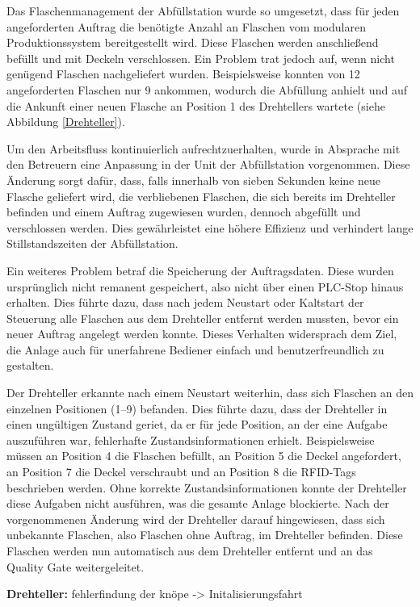Das Flaschenmanagement der Abfüllstation wurde so umgesetzt, dass für jeden angeforderten Auftrag die benötigte Anzahl an Flaschen vom modularen 
Produktionssystem bereitgestellt wird. Diese Flaschen werden anschließend befüllt und mit Deckeln verschlossen. Ein Problem trat jedoch auf, wenn 
nicht genügend Flaschen nachgeliefert wurden. Beispielsweise konnten von 12 angeforderten Flaschen nur 9 ankommen, wodurch die Abfüllung anhielt 
und auf die Ankunft einer neuen Flasche an Position 1 des Drehtellers wartete (siehe Abbildung \ref{Drehteller}).

Um den Arbeitsfluss kontinuierlich aufrechtzuerhalten, wurde in Absprache mit den Betreuern eine Anpassung in der Unit der Abfüllstation 
vorgenommen. Diese Änderung sorgt dafür, dass, falls innerhalb von sieben Sekunden keine neue Flasche geliefert wird, die verbliebenen Flaschen, 
die sich bereits im Drehteller befinden und einem Auftrag zugewiesen wurden, dennoch abgefüllt und verschlossen werden. Dies gewährleistet eine 
höhere Effizienz und verhindert lange Stillstandszeiten der Abfüllstation.

Ein weiteres Problem betraf die Speicherung der Auftragsdaten. Diese wurden ursprünglich nicht remanent gespeichert, also nicht über einen 
PLC-Stop hinaus erhalten. Dies führte dazu, dass nach jedem Neustart oder Kaltstart der Steuerung alle Flaschen aus dem Drehteller entfernt 
werden mussten, bevor ein neuer Auftrag angelegt werden konnte. Dieses Verhalten widersprach dem Ziel, die Anlage auch für unerfahrene Bediener 
einfach und benutzerfreundlich zu gestalten.

Der Drehteller erkannte nach einem Neustart weiterhin, dass sich Flaschen an den einzelnen Positionen (1–9) befanden. Dies führte dazu, dass der 
Drehteller in einen ungültigen Zustand geriet, da er für jede Position, an der eine Aufgabe auszuführen war, fehlerhafte Zustandsinformationen 
erhielt. Beispielsweise müssen an Position 4 die Flaschen befüllt, an Position 5 die Deckel angefordert, an Position 7 die Deckel verschraubt 
und an Position 8 die RFID-Tags beschrieben werden. Ohne korrekte Zustandsinformationen konnte der Drehteller diese Aufgaben nicht ausführen, 
was die gesamte Anlage blockierte. Nach der vorgenommenen Änderung wird der Drehteller darauf hingewiesen, dass sich unbekannte Flaschen, also 
Flaschen ohne Auftrag, im Drehteller befinden. Diese Flaschen werden nun automatisch aus dem Drehteller entfernt und an das Quality Gate 
weitergeleitet.

\textbf{Drehteller:} 
fehlerfindung der knöpe -> Initalisierungsfahrt 


